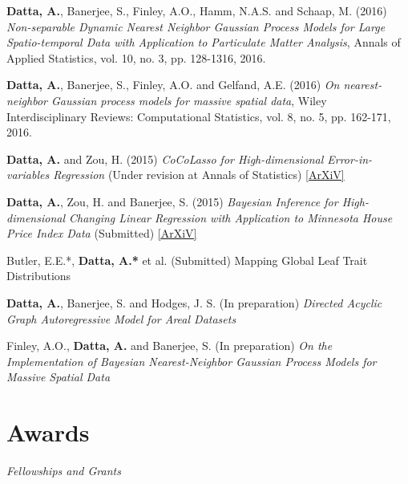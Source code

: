 \documentclass[11pt,a4paper,sans]{moderncv} %
\begin{document}
{\vskip 4mm \textbf{Datta, A.}, Banerjee, S., Finley, A.O., Hamm, N.A.S. and Schaap, M. (2016) {\em Non-separable Dynamic Nearest Neighbor Gaussian Process Models for Large Spatio-temporal Data with Application to Particulate Matter Analysis}, Annals of Applied Statistics, vol. 10, no. 3, pp. 128-1316, 2016.

\vskip 4mm \textbf {Datta, A.}, Banerjee, S., Finley, A.O. and Gelfand, A.E. (2016) {\em On nearest-neighbor Gaussian process models for massive spatial data}, Wiley Interdisciplinary Reviews: Computational Statistics, vol. 8, no. 5, pp. 162-171, 2016.

\vskip 4mm \textbf{Datta, A.} and Zou, H. (2015) {\em CoCoLasso for High-dimensional Error-in-variables Regression} (Under revision at Annals of Statistics) \href{https://arxiv.org/pdf/1510.07123v2.pdf}{[ArXiV]}

\vskip 4mm \textbf{Datta, A.}, Zou, H. and Banerjee, S. (2015) {\em Bayesian Inference for High-dimensional Changing Linear Regression with Application to Minnesota House Price Index Data} (Submitted) \href{https://arxiv.org/pdf/1510.07129.pdf}{[ArXiV]}

\vskip 2mm Butler, E.E.*, \textbf {Datta, A.*} et al. (Submitted) {\em }Mapping Global Leaf Trait Distributions}

\vskip 4mm \textbf{Datta, A.}, Banerjee, S. and Hodges, J. S. (In preparation) {\em Directed Acyclic Graph Autoregressive Model for Areal Datasets}

\vskip 4mm Finley, A.O., \textbf{Datta, A.} and Banerjee, S. (In preparation) {\em On the Implementation of Bayesian Nearest-Neighbor Gaussian Process Models for Massive Spatial Data}


 \section{Awards}
{\em Fellowships and Grants \vskip 2mm}

 {%
}

\end{document}
